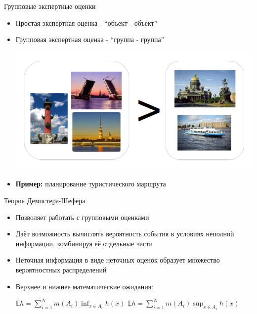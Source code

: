 \documentclass[11pt]{beamer}
\begin{document}
\begin{frame}{Групповые экспертные оценки}

\begin{itemize}
	\item Простая экспертная оценка - ``объект - объект''
	\item Групповая экспертная оценка - ``группа - группа''
	\begin{center}
			\includegraphics[scale=0.4]{interval_judgment}
		\end{center}
	\item \textbf{Пример:} планирование туристического маршрута
\end{itemize}

\end{frame}
\begin{frame}{Теория Демпстера-Шефера}

\begin{itemize}
	\item Позволяет работать с групповыми оценками
	\item Даёт возможность вычислять вероятность события в условиях неполной информации, комбинируя её отдельные части
	\item Неточная информация в виде неточных оценок образует множество вероятностных распределений \linebreak
	\item Верхнее и нижнее математические ожидания:
	\begin{center}
	\(\mathbb{\overline{E}} h = \sum \limits_{i=1}^N m(A_i) \inf_{x \in A_i} h(x)\) \linebreak
	\(\mathbb{\underline{E}} h = \sum \limits_{i=1}^N m(A_i) \sup_{x \in A_i} h(x)\)
	\end{center}
\end{itemize}

\end{frame}
\end{document}
